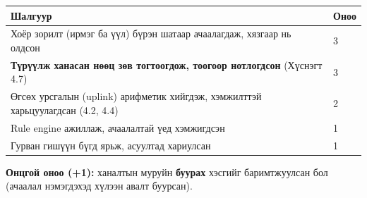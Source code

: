 \begingroup\scriptsize\begin{longtable}[]{@{}ll@{}}
\toprule
\begin{minipage}[b]{0.47\columnwidth}\raggedright
Шалгуур\strut
\end{minipage} & \begin{minipage}[b]{0.47\columnwidth}\raggedright
Оноо\strut
\end{minipage}\tabularnewline
\midrule
\endhead
\begin{minipage}[t]{0.47\columnwidth}\raggedright
Хоёр зорилт (ирмэг ба үүл) бүрэн шатаар ачаалагдаж, хязгаар нь олдсон\strut
\end{minipage} & \begin{minipage}[t]{0.47\columnwidth}\raggedright
3\strut
\end{minipage}\tabularnewline
\begin{minipage}[t]{0.47\columnwidth}\raggedright
\textbf{Түрүүлж ханасан нөөц зөв тогтоогдож, тоогоор нотлогдсон} (Хүснэгт 4.7)\strut
\end{minipage} & \begin{minipage}[t]{0.47\columnwidth}\raggedright
3\strut
\end{minipage}\tabularnewline
\begin{minipage}[t]{0.47\columnwidth}\raggedright
Өгсөх урсгалын (uplink) арифметик хийгдэж, хэмжилттэй харьцуулагдсан (4.2, 4.4)\strut
\end{minipage} & \begin{minipage}[t]{0.47\columnwidth}\raggedright
2\strut
\end{minipage}\tabularnewline
\begin{minipage}[t]{0.47\columnwidth}\raggedright
Rule engine ажиллаж, ачаалалтай үед хэмжигдсэн\strut
\end{minipage} & \begin{minipage}[t]{0.47\columnwidth}\raggedright
1\strut
\end{minipage}\tabularnewline
\begin{minipage}[t]{0.47\columnwidth}\raggedright
Гурван гишүүн бүгд ярьж, асуултад хариулсан\strut
\end{minipage} & \begin{minipage}[t]{0.47\columnwidth}\raggedright
1\strut
\end{minipage}\tabularnewline
\bottomrule
\end{longtable}\endgroup

\textbf{Онцгой оноо (+1):} ханалтын муруйн \textbf{буурах} хэсгийг баримтжуулсан бол (ачаалал нэмэгдэхэд хүлээн авалт буурсан).

